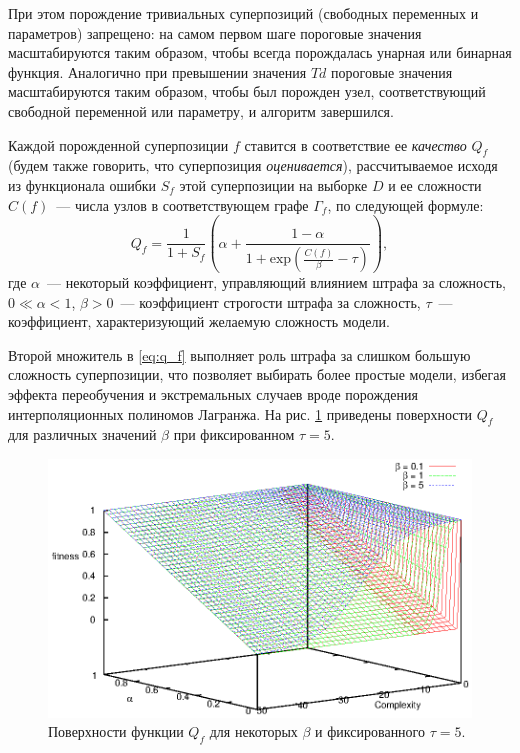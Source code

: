 \documentclass[12pt,a4paper]{article}
\begin{document}
При этом порождение тривиальных суперпозиций (свободных переменных и
параметров) запрещено: на самом первом шаге пороговые значения масштабируются
таким образом, чтобы всегда порождалась унарная или бинарная функция.
Аналогично при превышении значения $Td$ пороговые значения масштабируются
таким образом, чтобы был порожден узел, соответствующий свободной переменной
или параметру, и алгоритм завершился.

Каждой порожденной суперпозиции $f$ ставится в
соответствие ее \emph{качество} $Q_f$ (будем также говорить, что
суперпозиция \emph{оценивается}), рассчитываемое исходя из функционала ошибки
$S_f$ этой суперпозиции на выборке $D$ и ее сложности $C(f)$~---
числа узлов в соответствующем графе $\Gamma_f$, по следующей формуле:
\begin{equation}
  \label{eq:q_f}
  Q_f = \frac{1}{1 + S_f} \left(\alpha + \frac{1 - \alpha}{1 + \text{exp} (\frac{C(f)}{\beta} - \tau)}\right),
\end{equation}
где $\alpha$~--- некоторый коэффициент, управляющий влиянием штрафа за
сложность, $0 \ll \alpha < 1$,
$\beta > 0$~--- коэффициент строгости штрафа за сложность,
$\tau$~--- коэффициент, характеризующий желаемую сложность модели.

Второй множитель в \eqref{eq:q_f} выполняет роль штрафа за слишком
большую сложность суперпозиции, что позволяет выбирать более простые модели,
избегая эффекта переобучения и экстремальных случаев вроде порождения
интерполяционных полиномов Лагранжа. На рис. \ref{fig:fitness_surph}
приведены поверхности $Q_f$ для различных значений $\beta$ при фиксированном
$\tau = 5$.

\begin{figure}[h]
  \vspace{-20pt}
  \includegraphics[scale=1.40]{figs/fitness.eps}
  \vspace{-30pt}
  \caption{Поверхности функции $Q_f$ для некоторых $\beta$
    и фиксированного $\tau = 5$.}
  \label{fig:fitness_surph}
\end{figure}
\end{document}
